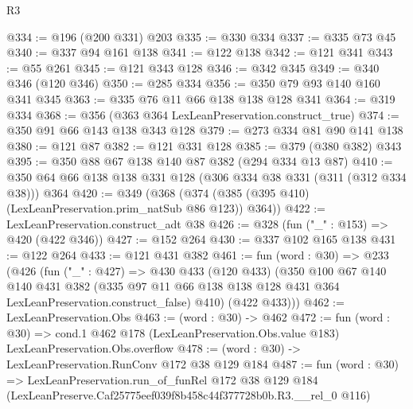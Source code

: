 \begin{lexlean}{R3}
\begin{coremodule}
@334 := @196 (@200 @331) @203
@335 := @330 @334
@337 := @335 @73 @45
@340 := @337 @94 @161 @138
@341 := @122 @138
@342 := @121 @341
@343 := @55 @261
@345 := @121 @343 @128
@346 := @342 @345
@349 := @340 @346 (@120 @346)
@350 := @285 @334
@356 := @350 @79 @93 @140 @160 @341 @345
@363 := @335 @76 @11 @66 @138 @138 @128 @341
@364 := @319 @334
@368 := @356 (@363 @364 LexLeanPreservation.construct_true)
@374 := @350 @91 @66 @143 @138 @343 @128
@379 := @273 @334 @81 @90 @141 @138
@380 := @121 @87
@382 := @121 @331 @128
@385 := @379 (@380 @382) @343
@395 := @350 @88 @67 @138 @140 @87 @382 (@294 @334 @13 @87)
@410 := @350 @64 @66 @138 @138 @331 @128 (@306 @334 @38 @331 (@311 (@312 @334 @38))) @364
@420 := @349 (@368 (@374 (@385 (@395 @410) (LexLeanPreservation.prim_natSub @86 @123)) @364))
@422 := LexLeanPreservation.construct_adt @38
@426 := @328 (fun ("_" : @153) => @420 (@422 @346))
@427 := @152 @264
@430 := @337 @102 @165 @138
@431 := @122 @264
@433 := @121 @431 @382
@461 := fun (word : @30) =>
  @233
    (@426
      (fun ("_" : @427) =>
      @430
        @433
        (@120 @433)
        (@350
          @100
          @67
          @140
          @140
          @431
          @382
          (@335 @97 @11 @66 @138 @138 @128 @431 @364 LexLeanPreservation.construct_false)
          @410)
        (@422 @433)))
@462 := LexLeanPreservation.Obs
@463 := (word : @30) -> @462
@472 := fun (word : @30) =>
  cond.{1} @462 @178 (LexLeanPreservation.Obs.value @183) LexLeanPreservation.Obs.overflow
@478 := (word : @30) -> LexLeanPreservation.RunConv @172 @38 @129 @184
@487 := fun (word : @30) =>
  LexLeanPreservation.run_of_funRel
    @172
    @38
    @129
    @184
    (LexLeanPreserve.Caf25775eef039f8b458c44f377728b0b.R3.__rel_0 @116)
\end{coremodule}
\end{lexlean}
